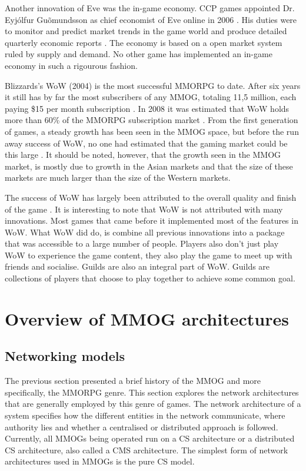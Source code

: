 \documentclass[journal,oneside,a4paper,onecolumn]{IEEEtran}
\begin{document}
Another innovation of Eve was the in-game economy. CCP games appointed Dr. Eyj\'{o}lfur Gu\~{o}mundsson as chief economist of Eve online in 2006 \cite{eve_economist}. His duties were to monitor and predict market trends in the game world and produce detailed quarterly economic reports \cite{eve_econ_rep}.  The economy is based on a open market system ruled by supply and demand. No other game has implemented an in-game economy in such a rigourous fashion.

Blizzards's \ac{WoW} (2004) is the most successful MMORPG to date. After six years it still has by far the most subscribers of any MMOG, totaling 11,5 million, each paying \$15 per month subscription \cite{wow_subscibers}. In 2008 it was estimated that WoW holds more than 60\% of the MMORPG subscription market \cite{mmog_sub_market}. From the first generation of games, a steady growth has been seen in the MMOG space, but before the run away success of WoW, no one had estimated that the gaming market could be this large \cite{mmog_growth_analysis}. It should be noted, however, that the growth seen in the \ac{MMOG} market, is mostly due to growth in the Asian markets and that the size of these markets are much larger than the size of the Western markets.

The success of \ac{WoW} has largely been attributed to the overall quality and finish of the game \cite{wow_gameplay}. It is interesting to note that WoW is not attributed with many innovations. Most games that came before it implemented most of the features in WoW. What WoW did do, is combine all previous innovations into a package that was accessible to a large number of people.  Players also don't just play WoW to experience the game content, they also play the game to meet up with friends and socialise. Guilds are also an integral part of WoW. Guilds are collections of players that choose to play together to achieve some common goal.

\section{Overview of MMOG architectures}

\subsection{Networking models}

The previous section presented a brief history of the \ac{MMOG} and more specifically, the \ac{MMORPG} genre. This section explores the network architectures that are generally employed by this genre of games. The network architecture of a system specifies how the different entities in the network communicate, where authority lies and whether a centralised or distributed approach is followed. Currently, all MMOGs being operated run on a \ac{CS} architecture or a distributed \ac{CS} architecture, also called a \ac{CMS} architecture. The simplest form of network architectures used in MMOGs is the pure \ac{CS} model.
\end{document}

